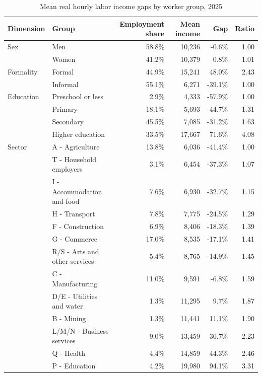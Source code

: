 \begin{table}[!htbp]
  \centering
  \caption{Mean real hourly labor income gaps by worker group, 2025}
  \label{tab:descriptive-wage-gaps-2025}
  \scriptsize
  \begin{tabular}{lp{}rrrr}
    \toprule
    Dimension & Group & Employment share & Mean income & Gap & Ratio \\
    \midrule
    Sex & Men & 58.8\% & 10,236 & -0.6\% & 1.00 \\
        & Women & 41.2\% & 10,379 & 0.8\% & 1.01 \\
    \midrule
    Formality & Formal & 44.9\% & 15,241 & 48.0\% & 2.43 \\
              & Informal & 55.1\% & 6,271 & -39.1\% & 1.00 \\
    \midrule
    Education & Preschool or less & 2.9\% & 4,333 & -57.9\% & 1.00 \\
             & Primary & 18.1\% & 5,693 & -44.7\% & 1.31 \\
             & Secondary & 45.5\% & 7,085 & -31.2\% & 1.63 \\
             & Higher education & 33.5\% & 17,667 & 71.6\% & 4.08 \\
    \midrule
    Sector & A - Agriculture & 13.8\% & 6,036 & -41.4\% & 1.00 \\
           & T - Household employers & 3.1\% & 6,454 & -37.3\% & 1.07 \\
           & I - Accommodation and food & 7.6\% & 6,930 & -32.7\% & 1.15 \\
           & H - Transport & 7.8\% & 7,775 & -24.5\% & 1.29 \\
           & F - Construction & 6.9\% & 8,406 & -18.3\% & 1.39 \\
           & G - Commerce & 17.0\% & 8,535 & -17.1\% & 1.41 \\
           & R/S - Arts and other services & 5.4\% & 8,765 & -14.9\% & 1.45 \\
           & C - Manufacturing & 11.0\% & 9,591 & -6.8\% & 1.59 \\
           & D/E - Utilities and water & 1.3\% & 11,295 & 9.7\% & 1.87 \\
           & B - Mining & 1.3\% & 11,441 & 11.1\% & 1.90 \\
           & L/M/N - Business services & 9.0\% & 13,459 & 30.7\% & 2.23 \\
           & Q - Health & 4.4\% & 14,859 & 44.3\% & 2.46 \\
           & P - Education & 4.2\% & 19,980 & 94.1\% & 3.31 \\

\end{tabular}
\end{table}
